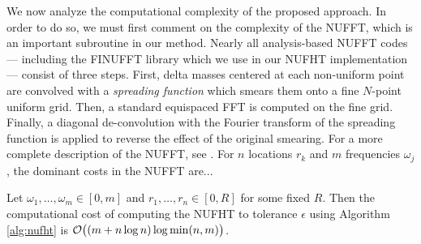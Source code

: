 We now analyze the computational complexity of the proposed approach. In order
to do so, we must first comment on the complexity of the NUFFT, which is an
important subroutine in our method. Nearly all analysis-based NUFFT codes ---
including the FINUFFT library \cite{barnett2019parallel} which we use in our
NUFHT implementation --- consist of three steps. First, delta masses centered at
each non-uniform point are convolved with a \textit{spreading function} which
smears them onto a fine $N$-point uniform grid. Then, a standard equispaced FFT
is computed on the fine grid. Finally, a diagonal de-convolution with the
Fourier transform of the spreading function is applied to reverse the effect of
the original smearing. For a more complete description of the NUFFT, see
\todocite. For $n$ locations $r_k$ and $m$ frequencies $\omega_j$, the dominant
costs in the NUFFT are... 

\begin{theorem}
    Let $\omega_1,\dots,\omega_m \in [0,m]$ and $r_1,\dots,r_n \in [0,R]$ for some fixed $R$. Then
    the computational cost of computing the NUFHT to tolerance $\epsilon$ using
    Algorithm \ref{alg:nufht} is $\mathcal{O}\big((m + n\log n) \log \min(n,m) \big)$.
\end{theorem}

